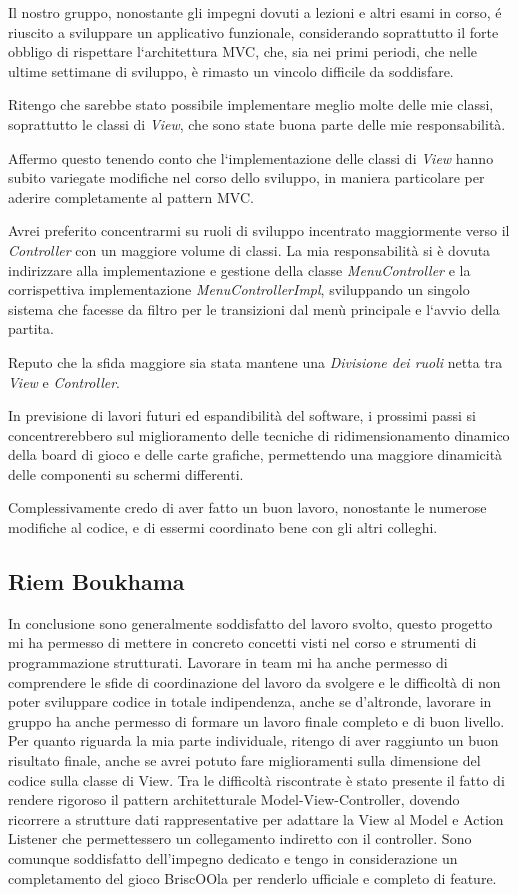 \documentclass[a4paper,12pt]{report}
\begin{document}
Il nostro gruppo, nonostante gli impegni dovuti a lezioni e altri esami in corso, é riuscito a sviluppare un applicativo funzionale, considerando soprattutto il forte obbligo di rispettare l`architettura MVC, che, sia nei primi periodi, che nelle ultime settimane di sviluppo, è rimasto un vincolo difficile da soddisfare.

Ritengo che sarebbe stato possibile implementare meglio molte delle mie classi, soprattutto le classi di \emph{View}, che sono state buona parte delle mie responsabilità.

Affermo questo tenendo conto che l`implementazione delle classi di \emph{View} hanno subito variegate modifiche nel corso dello sviluppo, in maniera particolare per aderire completamente al pattern MVC.

Avrei preferito concentrarmi su ruoli di sviluppo incentrato maggiormente verso il \emph{Controller} con un maggiore volume di classi.
La mia responsabilità si è dovuta indirizzare alla implementazione e gestione della classe \emph{MenuController} e la corrispettiva implementazione \emph{MenuControllerImpl}, sviluppando un singolo sistema che facesse da filtro per le transizioni dal menù principale e l`avvio della partita.

Reputo che la sfida maggiore sia stata mantene una \emph{Divisione dei ruoli} netta tra \emph{View} e \emph{Controller}.

In previsione di lavori futuri ed espandibilità del software, i prossimi passi si concentrerebbero sul miglioramento delle tecniche di ridimensionamento dinamico della board di gioco e delle carte grafiche, permettendo una maggiore dinamicità delle componenti su schermi differenti.

Complessivamente credo di aver fatto un buon lavoro, nonostante le numerose modifiche al codice, e di essermi coordinato bene con gli altri colleghi.

\subsection{Riem Boukhama}
In conclusione sono generalmente soddisfatto del lavoro svolto, questo progetto mi ha permesso di mettere in concreto concetti visti nel corso e strumenti di programmazione strutturati. Lavorare in team mi ha anche permesso di comprendere le sfide di coordinazione del lavoro da svolgere e le difficoltà di non poter sviluppare codice in totale indipendenza, anche se d’altronde, lavorare in gruppo ha anche permesso di formare un lavoro finale completo e di buon livello. Per quanto riguarda la mia parte individuale, ritengo di aver raggiunto un buon risultato finale, anche se avrei potuto fare miglioramenti sulla dimensione del codice sulla classe di View. 
Tra le difficoltà riscontrate è stato presente il fatto di rendere rigoroso il pattern architetturale Model-View-Controller, dovendo ricorrere a strutture dati rappresentative per adattare la View al Model e Action Listener che permettessero un collegamento indiretto con il controller. 
Sono comunque soddisfatto dell'impegno dedicato e tengo in considerazione un completamento del gioco BriscOOla per renderlo ufficiale e completo di feature.
\end{document}
